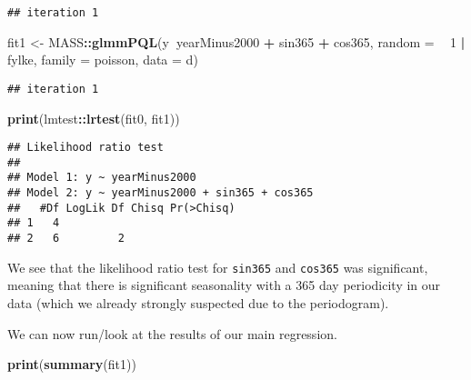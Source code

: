 \documentclass[]{book}
\newenvironment{Shaded}{\begin{snugshade}}{\end{snugshade}}
\newcommand{\KeywordTok}[1]{\textcolor[rgb]{0.13,0.29,0.53}{\textbf{#1}}}
\newcommand{\DataTypeTok}[1]{\textcolor[rgb]{0.13,0.29,0.53}{#1}}
\newcommand{\DecValTok}[1]{\textcolor[rgb]{0.00,0.00,0.81}{#1}}
\newcommand{\StringTok}[1]{\textcolor[rgb]{0.31,0.60,0.02}{#1}}
\newcommand{\OperatorTok}[1]{\textcolor[rgb]{0.81,0.36,0.00}{\textbf{#1}}}
\newcommand{\NormalTok}[1]{#1}
\begin{document}
\begin{verbatim}
## iteration 1
\end{verbatim}

\begin{Shaded}
\begin{Highlighting}[]
\NormalTok{fit1 <-}\StringTok{ }\NormalTok{MASS}\OperatorTok{::}\KeywordTok{glmmPQL}\NormalTok{(y}\OperatorTok{~}\NormalTok{yearMinus2000 }\OperatorTok{+}\StringTok{ }\NormalTok{sin365 }\OperatorTok{+}\StringTok{ }\NormalTok{cos365, }\DataTypeTok{random =} \OperatorTok{~}\StringTok{ }\DecValTok{1} \OperatorTok{|}\StringTok{ }\NormalTok{fylke,}
                \DataTypeTok{family =}\NormalTok{ poisson, }\DataTypeTok{data =}\NormalTok{ d)}
\end{Highlighting}
\end{Shaded}

\begin{verbatim}
## iteration 1
\end{verbatim}

\begin{Shaded}
\begin{Highlighting}[]
\KeywordTok{print}\NormalTok{(lmtest}\OperatorTok{::}\KeywordTok{lrtest}\NormalTok{(fit0, fit1))}
\end{Highlighting}
\end{Shaded}

\begin{verbatim}
## Likelihood ratio test
## 
## Model 1: y ~ yearMinus2000
## Model 2: y ~ yearMinus2000 + sin365 + cos365
##   #Df LogLik Df Chisq Pr(>Chisq)
## 1   4                           
## 2   6         2
\end{verbatim}

We see that the likelihood ratio test for \texttt{sin365} and
\texttt{cos365} was significant, meaning that there is significant
seasonality with a 365 day periodicity in our data (which we already
strongly suspected due to the periodogram).

\newpage

We can now run/look at the results of our main regression.

\begin{Shaded}
\begin{Highlighting}[]
\KeywordTok{print}\NormalTok{(}\KeywordTok{summary}\NormalTok{(fit1))}
\end{Highlighting}
\end{Shaded}
\end{document}
